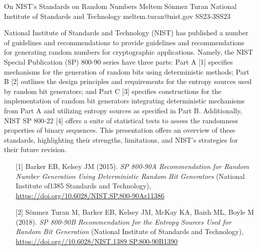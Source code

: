\begin{talk}
  {On NIST's Standards on Random Numbers}%
  {Meltem S\"{o}nmez Turan}%
  {National Institute of Standards and Technology}%
  {meltem.turan@nist.gov}%
 {}%
{}{}{SS23-3}{SS23}

			
National Institute of Standards and Technology (NIST) has published a number of guidelines and recommendations to provide guidelines and recommendations for generating random numbers for cryptographic applications. Namely, the NIST Special Publication (SP) 800-90 series have three parts: Part A [1] specifies mechanisms for the generation of random bits using deterministic methods; Part B [2] outlines the design principles and requirements for the entropy sources used by random bit generators; and Part C [3] specifies constructions for the implementation of random bit generators integrating deterministic mechanisms from Part A and utilizing entropy sources as specified in Part B. Additionally, NIST SP 800-22 [4] offers a suite of statistical tests to assess the randomness properties of binary sequences. This presentation offers an overview of these standards, highlighting their strengths, limitations, and NIST's strategies for their future revision. 

\medskip

\begin{enumerate}
\item[{[1]}] Barker EB, Kelsey JM (2015). {\it SP 800-90A Recommendation for Random Number Generation Using Deterministic Random Bit Generators} (National Institute of1385
Standards and Technology), \url{https://doi.org/10.6028/NIST.SP.800-90Ar11386}

\item[{[2]}] S\"{o}nmez Turan M, Barker EB, Kelsey JM, McKay KA, Baish ML, Boyle M (2018). {\it SP 800-90B Recommendation for the Entropy Sources Used for Random Bit Generation} (National Institute of Standards and Technology), \url{https://doi.org//10.6028/NIST.1389
SP.800-90B1390}


\end{enumerate}
\end{talk}
